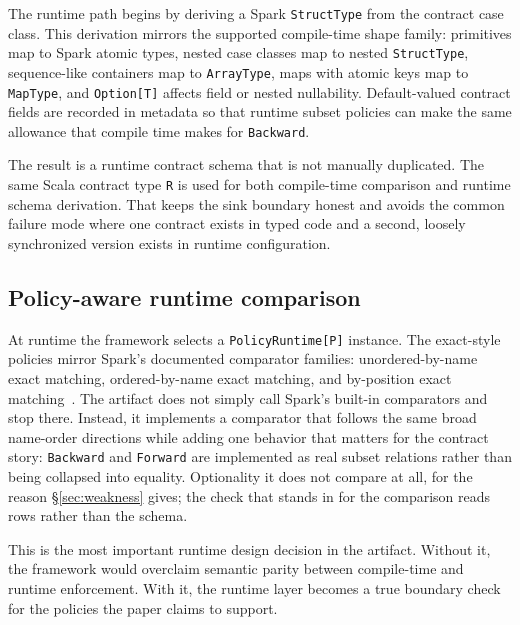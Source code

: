 The runtime path begins by deriving a Spark \texttt{StructType} from the contract case class. This derivation mirrors the supported compile-time shape family: primitives map to Spark atomic types, nested case classes map to nested \texttt{StructType}, sequence-like containers map to \texttt{ArrayType}, maps with atomic keys map to \texttt{MapType}, and \texttt{Option[T]} affects field or nested nullability. Default-valued contract fields are recorded in metadata so that runtime subset policies can make the same allowance that compile time makes for \texttt{Backward}.

The result is a runtime contract schema that is not manually duplicated. The same Scala contract type \texttt{R} is used for both compile-time comparison and runtime schema derivation. That keeps the sink boundary honest and avoids the common failure mode where one contract exists in typed code and a second, loosely synchronized version exists in runtime configuration.

\subsection{Policy-aware runtime comparison}

At runtime the framework selects a \texttt{PolicyRuntime[P]} instance. The exact-style policies mirror Spark's documented comparator families: unordered-by-name exact matching, ordered-by-name exact matching, and by-position exact matching~\cite{spark_datatype}. The artifact does not simply call Spark's built-in comparators and stop there. Instead, it implements a comparator that follows the same broad name-order directions while adding one behavior that matters for the contract story: \texttt{Backward} and \texttt{Forward} are implemented as real subset relations rather than being collapsed into equality. Optionality it does not compare at all, for the reason \S\ref{sec:weakness} gives; the check that stands in for the comparison reads rows rather than the schema.

This is the most important runtime design decision in the artifact. Without it, the framework would overclaim semantic parity between compile-time and runtime enforcement. With it, the runtime layer becomes a true boundary check for the policies the paper claims to support.

